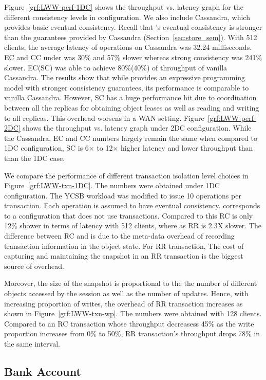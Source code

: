 Figure~\ref{grf:LWW-perf-1DC} shows the throughput vs. latency graph for the
different consistency levels in  configuration. We also include
Cassandra, which provides basic eventual consistency. Recall that \name's
eventual consistency is stronger than the guarantees provided by Cassandra
(Section~\ref{sec:store_sem}). With 512 clients, the average latency of
operations on Cassandra was 32.24 milliseconds. EC and CC under \name was 30\%
and 57\% slower whereas strong consistency was 241\% slower. EC(SC) was able to
achieve 80\%(40\%) of throughput of vanilla Cassandra. The results show that
while \name provides an expressive programming model with stronger consistency
guarantees, its performance is comparable to vanilla Cassandra. However, SC has
a huge performance hit due to coordination between all the replicas for
obtaining object leases as well as reading and writing to all replicas. This
overhead worsens in a WAN setting. Figure~\ref{grf:LWW-perf-2DC} shows the
throughput vs. latency graph under 2DC configuration. While the Cassandra, EC
and CC numbers largely remain the same when compared to 1DC configuration, SC
is 6$\times$ to 12$\times$ higher latency and lower throughput than than the
1DC case.

We compare the performance of different transaction isolation level choices in
Figure~\ref{grf:LWW-txn-1DC}. The numbers were obtained under 1DC
configuration. The YCSB workload was modified to issue 10 operations per
transaction. Each operation is assumed to have eventual consistency. 
corresponds to a configuration that does not use transactions. Compared to this
RC is only 12\% shower in terms of latency with 512 clients, where as RR is
2.3X slower. The difference between RC and  is due to the meta-data
overhead of recording transaction information in the object state. For RR
transaction, The cost of capturing and maintaining the snapshot in an RR
transaction is the biggest source of overhead.

Moreover, the size of the snapshot is proportional to the the number of
different objects accessed by the session as well as the number of updates.
Hence, with increasing proportion of writes, the overhead of RR transaction
increases as shown in Figure~\ref{grf:LWW-txn-wp}. The numbers were obtained
with 128 clients. Compared to an RC transaction whose throughput decreasess
45\% as the write proportion increases from 0\% to 50\%, RR transaction's
throughput drops 78\% in the same interval.

\subsection{Bank Account}

